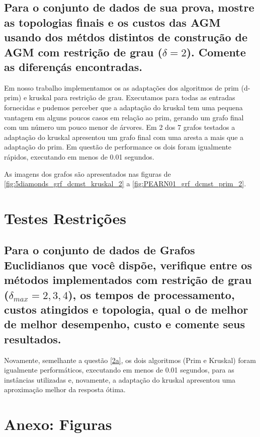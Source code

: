 \documentclass[12pt,a4paper]{article}
\begin{document}
\subsection{Para o conjunto de dados de sua prova, mostre as topologias finais e
\label{2a}
os custos das AGM usando dos métdos distintos de construção de AGM com restrição
de grau ($\delta=2$). Comente as diferençás encontradas.}

Em nosso trabalho implementamos os as adaptações dos algoritmos de prim (d-prim)
e kruskal para restrição de grau. Executamos para todas as entradas fornecidas e
pudemos perceber que a adaptação do kruskal tem uma pequena vantagem em alguns
poucos casos em relação ao prim, gerando um grafo final com um número um pouco
menor de árvores. Em 2 dos 7 grafos testados a adaptação do kruskal apresentou
um grafo final com uma aresta a mais que a adaptação do prim. Em questão de
performance os dois foram igualmente rápidos, executando em menos de 0.01
segundos.

As imagens dos grafos são apresentados nas figuras de
\ref{fig:5diamonds_grf_dcmst_kruskal_2} a \ref{fig:PEARN01_grf_dcmst_prim_2}.



\section{Testes Restrições}
\subsection{Para o conjunto de dados de Grafos Euclidianos que você dispõe,
verifique entre os métodos implementados com restrição de grau ($\delta_{max}=2,
3, 4$), os tempos de processamento, custos atingidos e topologia, qual o de
melhor de melhor desempenho, custo e comente seus resultados.}

Novamente, semelhante a questão \ref{2a}, os dois algoritmos (Prim e Kruskal)
foram igualmente performáticos, executando em menos de 0.01 segundos, para as
instâncias utilizadas e, novamente, a adaptação do kruskal apresentou uma
aproximação melhor da resposta ótima.



\section{Anexo: Figuras}
\end{document}
